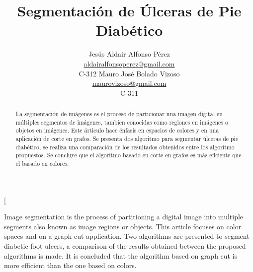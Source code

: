 \documentclass[a4paper,10pt,twocolumn]{article}
\title{Segmentaci\'on de \'Ulceras de Pie Diab\'etico}
\author{Jes\'us Aldair Alfonso P\'erez \\
\name  \email \href{mailto:aldairalfonsoperez@gmail.com}{aldairalfonsoperez@gmail.com}
    \\ \addr C-312  \AND
Mauro Jos\'e Bolado Vizoso \\
\name   \email \href{mailto:maurovizoso@gmail.com}{maurovizoso@gmail.com}
    \\ \addr C-311}
\begin{document}
\twocolumn[

\maketitle


\begin{abstract}

	La segmentaci\'on de im\'agenes es el proceso de particionar una imagen digital 
	en m\'ultiples segmentos de im\'agenes, tambien conocidas como regiones en im\'agenes 
	o objetos en im\'agenes. Este \'articulo hace \'enfasis en espacios de colores y en una 
	aplicaci\'on de corte en grafos. Se presenta dos algoritmo para segmentar \'ulceras de pie 
	diab\'etico, se realiza una comparaci\'on de los resultados obtenidos entre los algoritmo 
	propuestos. Se concluye que el algoritmo basado en corte en grafos es m\'as eficiente que 
	el basado en colores.

\end{abstract}

\vspace{0.5cm}

\begin{enabstract}
	
	Image segmentation is the process of partitioning a digital image into multiple segments 
	also known as image regions or objects. This article focuses on color spaces and on a 
	graph cut application. Two algorithms are presented to segment diabetic foot ulcers, a 
	comparison of the results obtained between the proposed algorithms is made. It is concluded 
	that the algorithm based on graph cut is more efficient than the one based on colors.

\end{enabstract}
\end{document}

